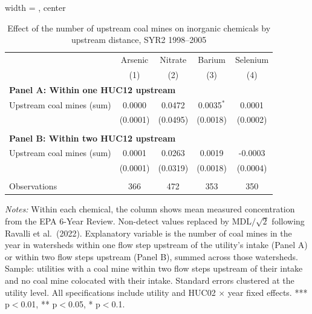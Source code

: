 \begin{table}[htbp]
   
   \caption{\label{tab:6yr_huc02fe_inorg_ravalli_2005_k2nmines} Effect of the number of upstream coal mines on inorganic chemicals by upstream distance, SYR2 1998--2005}
   \bigskip
   
   \centering
   
\begin{adjustbox}{width = \textwidth, center}
   \begin{tabular}{lcccc}
      \toprule
       & Arsenic & Nitrate & Barium & Selenium \\
                                & (1)      & (2)      & (3)          & (4)\\  
      \midrule 
      \multicolumn{5}{l}{\textbf{Panel A: Within one HUC12 upstream}} \\
      Upstream coal mines (sum) & 0.0000   & 0.0472   & 0.0035$^{*}$ & 0.0001\\   
                                & (0.0001) & (0.0495) & (0.0018)     & (0.0002)\\   
       \\
      \midrule 
      \multicolumn{5}{l}{\textbf{Panel B: Within two HUC12 upstream}} \\
      Upstream coal mines (sum) & 0.0001   & 0.0263   & 0.0019   & -0.0003\\   
                                & (0.0001) & (0.0319) & (0.0018) & (0.0004)\\   
       \\
      Observations              & 366      & 472      & 353      & 350\\  
      \bottomrule
   \end{tabular}
\end{adjustbox}
   
   {\tiny\linespread{1}\selectfont \par \raggedright 
   \textit{Notes:} Within each chemical, the column shows mean measured concentration from the EPA 6-Year Review. Non-detect values replaced by MDL$/\sqrt{2}$ following Ravalli et al.~(2022). Explanatory variable is the number of coal mines in the year in watersheds within one flow step upstream of the utility's intake (Panel A) or within two flow steps upstream (Panel B), summed across those watersheds. Sample: utilities with a coal mine within two flow steps upstream of their intake and no coal mine colocated with their intake. Standard errors clustered at the utility level. All specifications include utility and HUC02 $\times$ year fixed effects. *** p$<$0.01, ** p$<$0.05, * p$<$0.1.}
   
\end{table}


